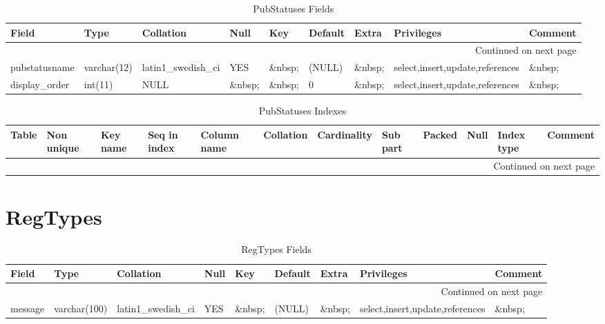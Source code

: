 \documentclass[tablesignature]{scrartcl}
\begin{document}
\begin{longtable}{|l|l|l|l|l|l|l|l|l|}
\caption{PubStatuses Fields} \label{tbl:pubsttausesfields}\\
\hline
 Field             &  Type         &  Collation                &  Null     &  Key      &  Default  &  Extra              &  Privileges                       &  Comment \\
\hline
\endhead
\hline\multicolumn{9}{r}{Continued on next page}\
\endfoot
\endlastfoot
\hline
 pubstatusid       &  int(11)      &  NULL                     &  \&nbsp;  &  PRI      &  (NULL)   &  auto\_{}increment  &  select,insert,update,references  &  \&nbsp;  \\
 pubstatusname     &  varchar(12)  &  latin1\_{}swedish\_{}ci  &  YES      &  \&nbsp;  &  (NULL)   &  \&nbsp;            &  select,insert,update,references  &  \&nbsp;  \\
 display\_{}order  &  int(11)      &  NULL                     &  \&nbsp;  &  \&nbsp;  &  0        &  \&nbsp;            &  select,insert,update,references  &  \&nbsp;  \\
\hline
\end{longtable}


\begin{longtable}{|l|l|l|l|l|l|l|l|l|l|l|l|}
\caption{PubStatuses Indexes} \label{tbl:pubstatusesindexes}\\
\hline
 Table        &  Non unique  &  Key name  &  Seq in index  &  Column name  &  Collation  &  Cardinality  &  Sub part  &  Packed  &  Null     &  Index type  &  Comment \\
\hline
\endhead
\hline\multicolumn{12}{r}{Continued on next page}\
\endfoot
\endlastfoot
\hline
 PubStatuses  &           0  &  PRIMARY   &             1  &  pubstatusid  &  A          &            3  &  (NULL)    &  (NULL)  &  \&nbsp;  &  BTREE       &  \&nbsp;  \\
\hline
\end{longtable}
\section{RegTypes}
\label{sec-19}


\begin{longtable}{|l|l|l|l|l|l|l|l|l|}
\caption{RegTypes Fields} \label{tbl:regtypesfields}\\
\hline
 Field    &  Type          &  Collation                &  Null     &  Key      &  Default  &  Extra    &  Privileges                       &  Comment \\
\hline
\endhead
\hline\multicolumn{9}{r}{Continued on next page}\
\endfoot
\endlastfoot
\hline
 regtype  &  varchar(40)   &  latin1\_{}swedish\_{}ci  &  \&nbsp;  &  PRI      &  \&nbsp;  &  \&nbsp;  &  select,insert,update,references  &  \&nbsp;  \\
 message  &  varchar(100)  &  latin1\_{}swedish\_{}ci  &  YES      &  \&nbsp;  &  (NULL)   &  \&nbsp;  &  select,insert,update,references  &  \&nbsp;  \\
\hline
\end{longtable}
\end{document}
